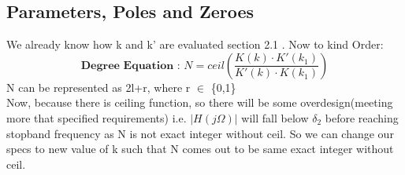 \documentclass{article}
\begin{document}
\subsection{Parameters, Poles and Zeroes}
We already know how k and k' are evaluated section 2.1 . Now to kind Order:\\
\begin{equation}
    \textbf{Degree Equation : }N = ceil({\frac{K(k)\cdot K'(k_1)}{K'(k)\cdot K(k_1)}})
\end{equation}
N can be represented as 2l+r, where r $\in$ \{0,1\}\\
Now, because there is ceiling function,  so there will be some overdesign(meeting more that specified requirements) i.e. $|H(j\Omega)|$ will fall below $\delta_2$ before reaching stopband frequency as N is not exact integer without ceil. So we can change our specs to new value of k such that N comes out to be same exact integer without ceil. 
\end{document}
